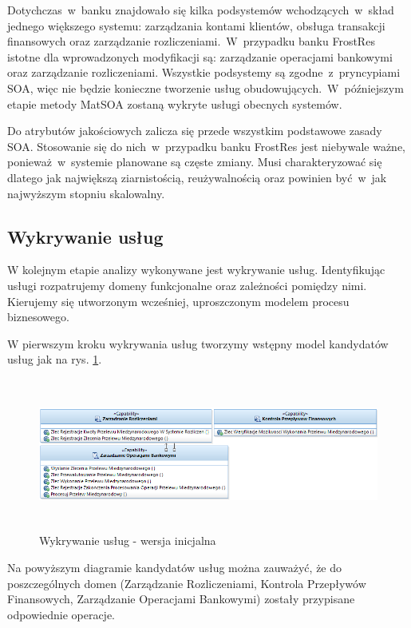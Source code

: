 Dotychczas~w~banku znajdowało się kilka podsystemów wchodzących~w~skład jednego większego systemu: zarządzania kontami klientów, obsługa transakcji finansowych oraz zarządzanie rozliczeniami.~W~przypadku banku FrostRes istotne dla wprowadzonych modyfikacji są: zarządzanie operacjami bankowymi oraz zarządzanie rozliczeniami. Wszystkie podsystemy są zgodne~z~pryncypiami SOA, więc nie będzie konieczne tworzenie usług obudowujących.~W~późniejszym etapie metody MatSOA zostaną wykryte usługi obecnych systemów.

Do atrybutów jakościowych zalicza się przede wszystkim podstawowe zasady SOA. Stosowanie się do nich~w~przypadku banku FrostRes jest niebywale ważne, ponieważ~w~systemie planowane są częste zmiany. Musi charakteryzować się dlatego jak największą ziarnistością, reużywalnością oraz powinien być~w~jak najwyższym stopniu skalowalny. 

\subsection{Wykrywanie usług}
W kolejnym etapie analizy wykonywane jest wykrywanie usług. Identyfikując usługi rozpatrujemy domeny funkcjonalne oraz zależności pomiędzy nimi. Kierujemy się utworzonym wcześniej, uproszczonym modelem procesu biznesowego. 

W pierwszym kroku wykrywania usług tworzymy wstępny model kandydatów usług jak na rys. \ref{service_candidates_init}.

\begin{figure}[h!tbp]
\begin{centering}
\includegraphics[width=16cm, height=5cm]{img/service_candidates_init.png}
\caption[Wykrywanie usług - wersja inicjalna]{Wykrywanie usług - wersja inicjalna}\label{service_candidates_init}
\end{centering}
\end{figure}

Na powyższym diagramie kandydatów usług można zauważyć, że do poszczególnych domen (Zarządzanie Rozliczeniami, Kontrola Przepływów Finansowych, Zarządzanie Operacjami Bankowymi) zostały przypisane odpowiednie operacje. 

